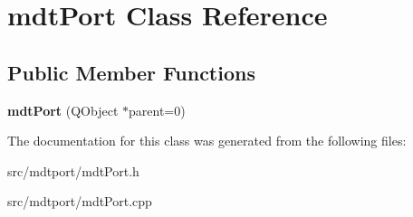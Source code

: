 \hypertarget{classmdt_port}{
\section{mdtPort Class Reference}
\label{classmdt_port}
}
\subsection*{Public Member Functions}
\begin{DoxyCompactItemize}
\item 
\hypertarget{classmdt_port_ac466eac9d1a54ea0e04c998660ad75ec}{
{\bfseries mdtPort} (QObject $\ast$parent=0)}
\label{classmdt_port_ac466eac9d1a54ea0e04c998660ad75ec}

\end{DoxyCompactItemize}


The documentation for this class was generated from the following files:\begin{DoxyCompactItemize}
\item 
src/mdtport/mdtPort.h\item 
src/mdtport/mdtPort.cpp\end{DoxyCompactItemize}
